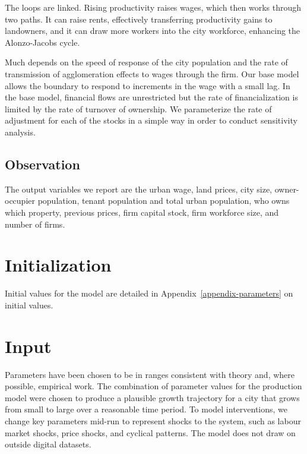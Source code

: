 The loops are linked. Rising productivity raises wages, which then works through two paths. It can raise rents, effectively transferring productivity gains to landowners, and it can draw more workers into the city workforce, enhancing the \Gls{Alonzo-Jacobs cycle}. 

Much depends on the speed of response of the city population and the rate of transmission of agglomeration effects to wages through the firm. Our base model allows the boundary to respond to increments in the wage with a small lag. In the base model, financial flows are unrestricted but the rate of financialization is limited by the rate of turnover of ownership. We parameterize the rate of adjustment for each of the stocks in a simple way in order to conduct sensitivity analysis.

\subsection{Observation}
The output variables we report are the urban wage, land prices, city size, owner-occupier population, tenant population and total urban population, who owns which property, previous prices, firm capital stock, firm workforce size, and number of firms.

\section{Initialization}
Initial values for the model are detailed in Appendix~\ref{appendix-parameters} on initial values.

\section{Input}
Parameters have been chosen to be in ranges consistent with theory and, where possible, empirical work. The combination of parameter values for the production model were chosen to produce a plausible growth trajectory for a city that grows from small to large over a reasonable time period. To model interventions, we change key parameters mid-run to represent shocks to the system, such as labour market shocks, price shocks, and cyclical patterns. %
The model does not draw on outside digital datasets. 

